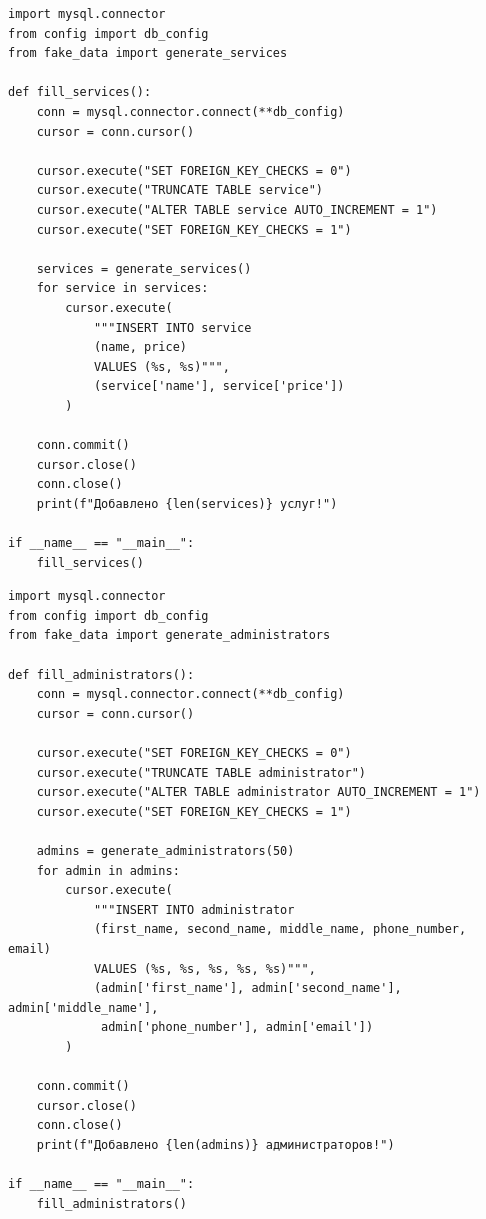 \documentclass[a4paper]{article}
\begin{document}
\begin{lstlisting}[caption = Заполнение таблицы Service, basicstyle= \scriptsize \ttfamily]
import mysql.connector
from config import db_config
from fake_data import generate_services

def fill_services():
    conn = mysql.connector.connect(**db_config)
    cursor = conn.cursor()

    cursor.execute("SET FOREIGN_KEY_CHECKS = 0")
    cursor.execute("TRUNCATE TABLE service")
    cursor.execute("ALTER TABLE service AUTO_INCREMENT = 1")
    cursor.execute("SET FOREIGN_KEY_CHECKS = 1")

    services = generate_services()
    for service in services:
        cursor.execute(
            """INSERT INTO service 
            (name, price)
            VALUES (%s, %s)""",
            (service['name'], service['price'])
        )
    
    conn.commit()
    cursor.close()
    conn.close()
    print(f"Добавлено {len(services)} услуг!")

if __name__ == "__main__":
    fill_services()
\end{lstlisting}

\begin{lstlisting}[caption = Заполнение таблицы Administrator, basicstyle= \scriptsize \ttfamily]
import mysql.connector
from config import db_config
from fake_data import generate_administrators

def fill_administrators():
    conn = mysql.connector.connect(**db_config)
    cursor = conn.cursor()

    cursor.execute("SET FOREIGN_KEY_CHECKS = 0")
    cursor.execute("TRUNCATE TABLE administrator")
    cursor.execute("ALTER TABLE administrator AUTO_INCREMENT = 1")
    cursor.execute("SET FOREIGN_KEY_CHECKS = 1")

    admins = generate_administrators(50)
    for admin in admins:
        cursor.execute(
            """INSERT INTO administrator 
            (first_name, second_name, middle_name, phone_number, email)
            VALUES (%s, %s, %s, %s, %s)""",
            (admin['first_name'], admin['second_name'], admin['middle_name'],
             admin['phone_number'], admin['email'])
        )
    
    conn.commit()
    cursor.close()
    conn.close()
    print(f"Добавлено {len(admins)} администраторов!")

if __name__ == "__main__":
    fill_administrators()
\end{lstlisting}
\end{document}
